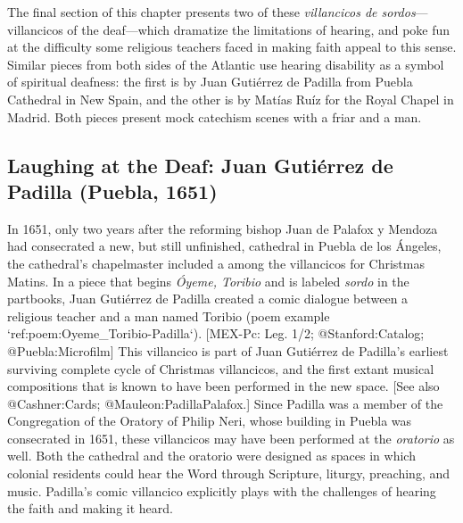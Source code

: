 The final section of this chapter presents two of these \emph{villancicos de sordos}---villancicos of the deaf---which dramatize the limitations of hearing, and poke fun at the difficulty some religious teachers faced in making faith appeal to this sense.
Similar pieces from both sides of the Atlantic use hearing disability as a symbol of spiritual deafness: the first is by Juan Gutiérrez de Padilla from Puebla Cathedral in New Spain, and the other is by Matías Ruíz for the Royal Chapel in Madrid.
Both pieces present mock catechism scenes with a friar and a  man.


\subsection{Laughing at the Deaf: Juan Gutiérrez de Padilla (Puebla, 1651)}

In 1651, only two years after the reforming bishop Juan de Palafox y Mendoza had consecrated a new, but still unfinished, cathedral in Puebla de los Ángeles, the cathedral's chapelmaster included a  among the villancicos for Christmas Matins.
In a piece that begins \emph{Óyeme, Toribio} and is labeled \emph{sordo} in the partbooks,  Juan Gutiérrez de Padilla created a comic dialogue between a religious teacher and a  man named Toribio (poem example `ref:poem:Oyeme_Toribio-Padilla`).
[MEX-Pc: Leg. 1/2; @Stanford:Catalog; @Puebla:Microfilm]
This villancico is part of Juan Gutiérrez de Padilla's earliest surviving complete cycle of Christmas villancicos, and the first extant musical compositions that is known to have been performed in the new space.
[See also @Cashner:Cards; @Mauleon:PadillaPalafox.]
Since Padilla was a member of the Congregation of the Oratory of Philip Neri, whose building in Puebla was consecrated in 1651, these villancicos may have been performed at the \emph{oratorio} as well.
Both the cathedral and the oratorio were designed as spaces in which colonial residents could hear the Word through Scripture, liturgy, preaching, and music.
Padilla's comic  villancico explicitly plays with the challenges of hearing the faith and making it heard.


